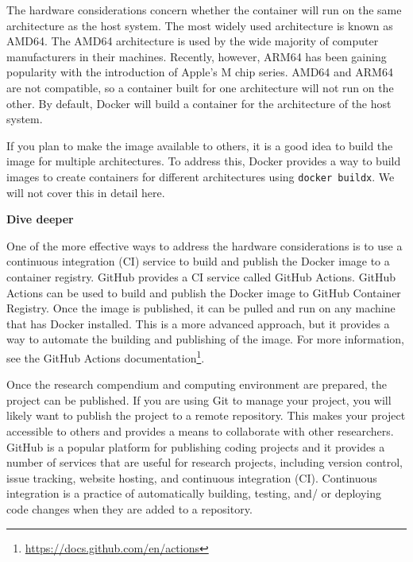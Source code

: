\documentclass[
  letterpaper,
]{latex/krantz}
\theoremstyle{definition}
\theoremstyle{remark}
\DeclareRobustCommand{\href}[2]{#2\footnote{\url{#1}}}
\begin{document}
The hardware considerations concern whether the container will run on
the same architecture as the host system. The most widely used
architecture is known as AMD64. The AMD64 architecture is used by the
wide majority of computer manufacturers in their machines. Recently,
however, ARM64 has been gaining popularity with the introduction of
Apple's M chip series. AMD64 and ARM64 are not compatible, so a
container built for one architecture will not run on the other. By
default, Docker will build a container for the architecture of the host
system.

If you plan to make the image available to others, it is a good idea to
build the image for multiple architectures. To address this, Docker
provides a way to build images to create containers for different
architectures using \texttt{docker\ buildx}. We will not cover this in
detail here.

\begin{tcolorbox}[enhanced jigsaw, colframe=quarto-callout-color-frame, breakable, bottomrule=.15mm, arc=.35mm, left=2mm, opacityback=0, rightrule=.15mm, colback=white, toprule=.15mm, leftrule=.75mm]

\textbf{ Dive deeper}

One of the more effective ways to address the hardware considerations is
to use a continuous integration (CI) service to build and publish the
Docker image to a container registry. GitHub provides a CI service
called GitHub Actions. GitHub Actions can be used to build and publish
the Docker image to GitHub Container Registry. Once the image is
published, it can be pulled and run on any machine that has Docker
installed. This is a more advanced approach, but it provides a way to
automate the building and publishing of the image. For more information,
see the \href{https://docs.github.com/en/actions}{GitHub Actions
documentation}.

\end{tcolorbox}

Once the research compendium and computing environment are prepared, the
project can be published. If you are using Git to manage your project,
you will likely want to publish the project to a remote repository. This
makes your project accessible to others and provides a means to
collaborate with other researchers. GitHub is a popular platform for
publishing coding projects and it provides a number of services that are
useful for research projects, including version control, issue tracking,
website hosting, and continuous integration (CI). Continuous integration
is a practice of automatically building, testing, and/ or deploying code
changes when they are added to a repository.
\end{document}
